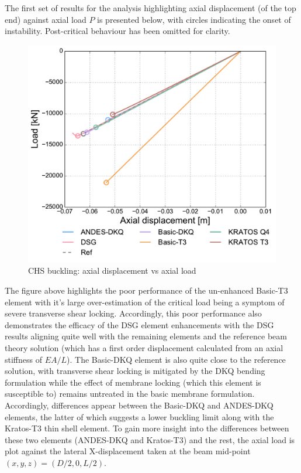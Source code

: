 The first set of results for the analysis highlighting axial displacement (of the top end) against axial load $P$ is presented below, with circles indicating the onset of instability. Post-critical behaviour has been omitted for clarity.

\begin{figure}[H]
	\centering
	\def\svgwidth{\columnwidth}
	\includegraphics[width=12cm]{images/stability_chs_axial_disp.pdf}
	\caption{CHS buckling: axial displacement vs axial load}
	\label{pic:eulerchs1}
\end{figure}

The figure above highlights the poor performance of the un-enhanced Basic-T3 element with it's large over-estimation of the critical load being a symptom of severe transverse shear locking. Accordingly, this poor performance also demonstrates the efficacy of the DSG element enhancements with the DSG results aligning quite well with the remaining elements and the reference beam theory solution (which has a first order displacement calculated from an axial stiffness of $EA/L$). The Basic-DKQ element is also quite close to the reference solution, with transverse shear locking is mitigated by the DKQ bending formulation while the effect of membrane locking (which this element is susceptible to) remains untreated in the basic membrane formulation. Accordingly, differences appear between the Basic-DKQ and ANDES-DKQ elements, the latter of which suggests a lower buckling limit along with the Kratos-T3 thin shell element. To gain more insight into the differences between these two elements (ANDES-DKQ and Kratos-T3) and the rest, the axial load is plot against the lateral X-displacement taken at the beam mid-point $(x,y,z) = (D/2,0,L/2)$.

